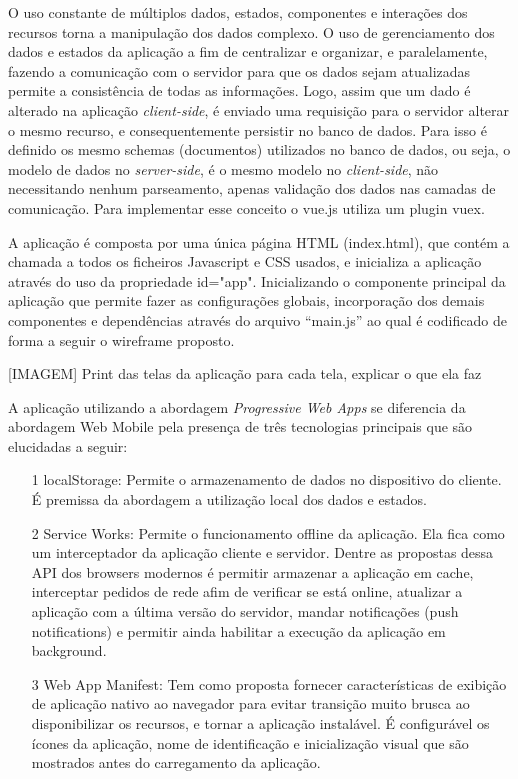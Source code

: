 O uso constante de múltiplos dados, estados, componentes e interações dos recursos torna a manipulação dos dados complexo. O uso de gerenciamento dos dados e estados da aplicação a fim de centralizar e organizar, e paralelamente, fazendo a comunicação com o servidor para que os dados sejam atualizadas permite a consistência de todas as informações. Logo, assim que um dado é alterado na aplicação \textit{client-side}, é enviado uma requisição para o servidor alterar o mesmo recurso, e consequentemente persistir no banco de dados. Para isso é definido os mesmo schemas (documentos) utilizados no banco de dados, ou seja, o modelo de dados no \textit{server-side}, é o mesmo modelo no \textit{client-side}, não necessitando nenhum parseamento, apenas validação dos dados nas camadas de comunicação. Para implementar esse conceito o vue.js utiliza um plugin vuex.

A aplicação é composta por uma única página HTML (index.html), que contém a chamada a todos os ficheiros Javascript e CSS usados, e inicializa a aplicação através do uso da propriedade id="app". Inicializando o componente principal  da aplicação que permite fazer as configurações globais, incorporação dos demais componentes e dependências através do arquivo “main.js” ao qual é codificado de forma a seguir o wireframe proposto.


[IMAGEM]  Print das telas da aplicação para cada tela, explicar o que ela faz

A aplicação utilizando a abordagem \textit{Progressive Web Apps} se diferencia da abordagem Web Mobile pela presença de três tecnologias principais que são elucidadas a seguir:

\begin{enumerate}
	\item [1] localStorage: Permite o armazenamento de dados no dispositivo do cliente. É premissa da abordagem a utilização local dos dados e estados.
	\item [2] Service Works: Permite o funcionamento offline da aplicação. Ela fica como um interceptador da aplicação cliente e servidor. Dentre as propostas dessa API dos browsers modernos é permitir armazenar a aplicação em cache, interceptar pedidos de rede afim de verificar se está online, atualizar a aplicação com a última versão do servidor, mandar notificações (push notifications) e permitir ainda habilitar a execução da aplicação em background.
	\item [3] Web App Manifest: Tem como proposta fornecer características de exibição de aplicação nativo ao navegador para evitar transição muito brusca ao disponibilizar os recursos, e tornar a aplicação instalável. É configurável os ícones da aplicação, nome de identificação e inicialização visual que são mostrados antes do carregamento da aplicação.
\end{enumerate}

